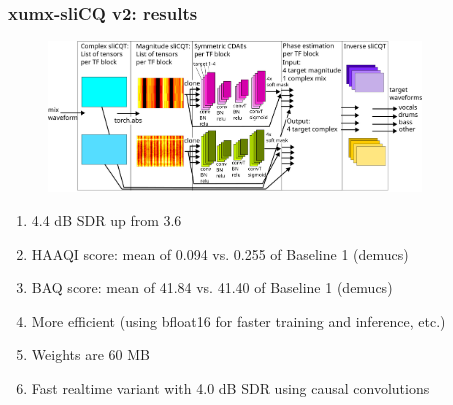 \documentclass[usenames,dvipsnames]{beamer}
\begin{document}
\begin{frame}
	\frametitle{xumx-sliCQ v2: results}
        \begin{figure}[ht]
		\centering
		\includegraphics[height=4cm]{./images/xumx_slicq_v2.png}
	\end{figure}
        \begin{enumerate}
        \item
                4.4 dB SDR up from 3.6
        \item
                HAAQI score: mean of 0.094 vs. 0.255 of Baseline 1 (demucs)
        \item
                BAQ score: mean of 41.84 vs. 41.40 of Baseline 1 (demucs)
        \item
                More efficient (using bfloat16 for faster training and inference, etc.)
        \item
                Weights are 60 MB
        \item
                Fast realtime variant with 4.0 dB SDR using causal convolutions
        \end{enumerate}
\end{frame}
\end{document}
